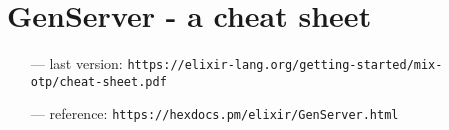\documentclass[a4paper]{article}
\begin{document}
\section*{GenServer - a cheat sheet}
\begin{itemize}
  \setlength\itemsep{0em}
\item[---] last version: \verb|https://elixir-lang.org/getting-started/mix-otp/cheat-sheet.pdf|
\item[---] reference: \verb|https://hexdocs.pm/elixir/GenServer.html|
\end{itemize}
\begin{comment}
  copyright 2019 by Mario Frasca et al.

  based on a work by Benjamin Tan Wei Hao,
  rewritten as a tex/tikz document by Mario Frasca,
  with José Valim validating the content.

  TODO: add yourself to the authors if you think so.
\end{comment}
\end{document}
